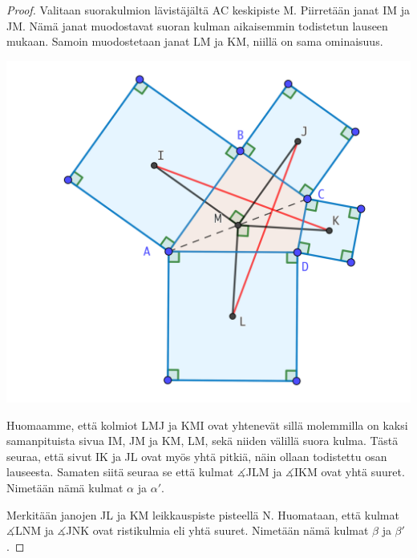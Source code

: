 \documentclass{scrartcl}
\begin{document}
\medskip
\begin{proof}
Valitaan suorakulmion lävistäjältä AC keskipiste M. Piirretään janat IM ja JM. Nämä janat muodostavat suoran kulman aikaisemmin todistetun lauseen mukaan. Samoin muodostetaan janat LM ja KM, niillä on sama ominaisuus.
\begin{center}
    \includegraphics[scale=0.25]{todistus1}
\end{center}
Huomaamme, että kolmiot LMJ ja KMI ovat yhtenevät sillä molemmilla on kaksi samanpituista sivua IM, JM ja KM, LM, sekä niiden välillä suora kulma. Tästä seuraa, että sivut IK ja JL ovat myös yhtä pitkiä, näin ollaan todistettu osan lauseesta. Samaten siitä seuraa se että kulmat $\measuredangle$JLM ja $\measuredangle$IKM ovat yhtä suuret. Nimetään nämä kulmat $\alpha$ ja $\alpha'$.

Merkitään janojen JL ja KM leikkauspiste pisteellä N. Huomataan, että kulmat $\measuredangle$LNM ja $\measuredangle$JNK ovat ristikulmia eli yhtä suuret. Nimetään nämä kulmat $\beta$ ja $\beta'$.


\end{proof}
\end{document}
